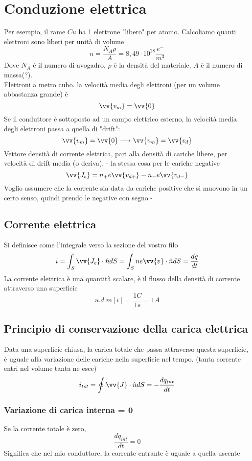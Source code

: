 \documentclass[a4paper]{report}
\begin{document}
  \section{Conduzione elettrica}
  Per esempio, il rame $Cu$ ha 1 elettrone "libero" per atomo. Calcoliamo quanti elettroni sono liberi per unità di volume
  $$ n = \frac{N_A \rho}{ A} = 8,49 \cdot 10^{28} \frac{e^-}{m^3} $$
  Dove $N_A$ è il numero di avogadro, $\rho$ è la densità del materiale, $A$ è il numero di massa(?).\\
  Elettroni a metro cubo. la velocità media degli elettroni (per un volume abbastanza grande) è
  $$\vv{v_m} = \vv{0}$$
  Se il conduttore è sottoposto ad un campo elettrico esterno, la velocità media degli elettroni passa a quella di "drift":
  $$ \vv{v_m} = \vv{0} \longrightarrow \vv{v_m} = \vv{v_d} $$
  Vettore densità di corrente elettrica, pari alla densità di cariche libere, per velocità di drift media (o deriva), - la stessa cosa per le cariche negative
  $$ \vv{J_e} = n_+ e \vv{v_{d+}} - n_- e \vv{v_{d-}}$$
  Voglio assumere che la corrente sia data da cariche positive che si muovono in un certo senso, quindi prendo le negative con segno -

  \subsection{Corrente elettrica}
  Si definisce come l'integrale verso la sezione del vostro filo
  $$ i = \int_S \vv{J_e} \cdot \hat{n} dS = \int_S n e \vv{v} \cdot \hat{n} dS = \frac{dq}{dt}$$
  La corrente elettrica è una quantità scalare, è il flusso della densità di corrente attraverso una superficie
  $$ u.d.m[i]=\frac{1C}{1s}= 1A $$

  \subsection{Principio di conservazione della carica elettrica}
  Data una superficie chiusa, la carica totale che passa attraverso questa superficie, è uguale alla variazione delle cariche nella superficie nel tempo. (tanta corrente entri nel volume tanta ne esce)
  $$ i_{tot} = \oint \vv{J} \cdot \hat{n} dS = -\frac{dq_{int}}{dt} $$
  \subsubsection{Variazione di carica interna = 0}
  Se la corrente totale è zero,
  $$\frac{dq_{int}}{dt} = 0$$
  Significa che nel mio conduttore, la corrente entrante è uguale a quella uscente
\end{document}
